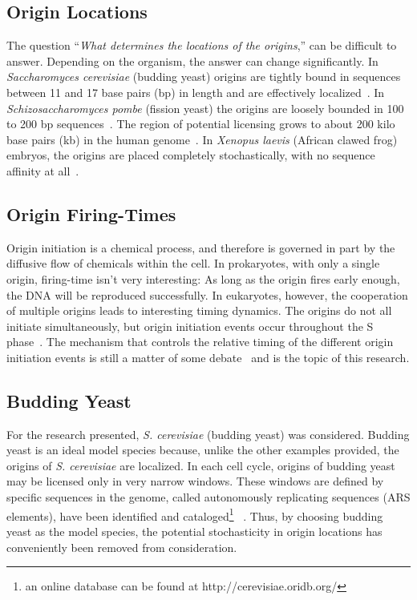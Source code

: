 	
		\subsection{Origin Locations}
		\label{subsec:OriginLocations}
		
		The question ``\emph{What determines the locations of the origins},'' can be difficult to answer.
		Depending on the organism, the answer can change significantly.
		In \emph{Saccharomyces cerevisiae} (budding yeast) origins are tightly bound in sequences between 11 and 17 base pairs (bp) in length and are effectively localized~\cite{ScottsPaper}.
		In \emph{Schizosaccharomyces pombe} (fission yeast) the origins are loosely bounded in 100 to 200 bp sequences~\cite{OriginsReview}.
		The region of potential licensing grows to about 200 kilo base pairs (kb) in the human genome~\cite{HumanGenome}.
		In \emph{Xenopus laevis} (African clawed frog) embryos, the origins are placed completely stochastically, with no sequence affinity at all~\cite{FrogEmbryo}.
		
		
		\subsection{Origin Firing-Times}
		\label{subsec:OriginTimes}
		
		Origin initiation is a chemical process, and therefore is governed in part by the diffusive flow of chemicals within the cell.
		In prokaryotes, with only a single origin, firing-time isn't very interesting:
		As long as the origin fires early enough, the DNA will be reproduced successfully.
		In eukaryotes, however, the cooperation of multiple origins leads to interesting timing dynamics.
		The origins do not all initiate simultaneously, but origin initiation events occur throughout the S phase~\cite{DNAInitiation}.
		The mechanism that controls the relative timing of the different origin initiation events is still a matter of some debate~\cite{ScottsPaper,Bechhoefer2012374,deMouraModel1,deMouraModel2} and is the topic of this research.
		
		
		\subsection{Budding Yeast}
		\label{subsec:BuddingYeast}
		
		For the research presented, \emph{S. cerevisiae} (budding yeast) was considered.
		Budding yeast is an ideal model species because, unlike the other examples provided, the origins of \emph{S. cerevisiae} are localized.
		In each cell cycle, origins of budding yeast may be licensed only in very narrow windows.
		These windows are defined by specific sequences in the genome, called autonomously replicating sequences (ARS elements), have been identified and cataloged\footnote{an online database can be found at http://cerevisiae.oridb.org/}
~\cite{OriDB}.
		Thus, by choosing budding yeast as the model species, the potential stochasticity in origin locations has conveniently been removed from consideration.
		
